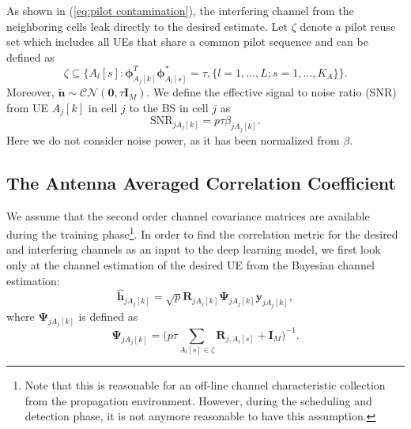 As shown in (\ref{eq:pilot contamination}), the interfering channel from the neighboring cells leak directly to the desired estimate. Let $\zeta$ denote a pilot reuse set which includes all UEs that share a common pilot sequence and can be defined as
\begin{equation}
\zeta \subseteq \{A_l[s]:\mathbf{\phi}_{A_j[k]}^T \mathbf{\phi}_{A_l[s]}^*=\tau, \{l=1,...,L;s=1,...,K_A\}\}.
\end{equation}
Moreover, $\tilde{\mathbf{n}}\sim\mathcal{CN\left(\mathit{\mathbf{0},\tau\mathbf{I}_M}\right)}$. We define the effective signal to noise ratio (SNR) from UE $A_j[k]$ in cell $j$ to the BS in cell $j$ as
\begin{equation}
\text{SNR}_{jA_j[k]}=p\tau\beta_{jA_j[k]}.%
\end{equation}
Here we do not consider noise power, as it has been normalized from $\beta$.%

\subsection{The Antenna Averaged Correlation Coefficient}
We assume that the second order channel covariance matrices are available during the training phase\footnote{Note that this is reasonable for an off-line channel characteristic collection from the propagation environment. However, during the scheduling and detection phase, it is not anymore reasonable to have this assumption.}.
In order to find the correlation metric for the desired and interfering channels as an input to the deep learning model, we first look only at the channel estimation of the desired UE from the Bayesian channel estimation:
\begin{equation}
\hat{\mathbf{h}}_{jA_j[k]} = \sqrt{p}\mathbf{R}_{jA_j[k]} \mathbf{\Psi}_{jA_j[k]} \mathbf{y}_{jA_j[k]}, 
\end{equation}
where $\mathbf{\Psi}_{jA_j[k]}$ is defined as
\begin{equation}
\mathbf{\Psi}_{jA_j[k]} = \Bigg(p\tau\sum_{A_l[s]\in\zeta} \mathbf{R}_{j,A_l[s]} + \mathbf{I}_M\Bigg)^{-1}.
\label{eq:psi_function}
\end{equation}

